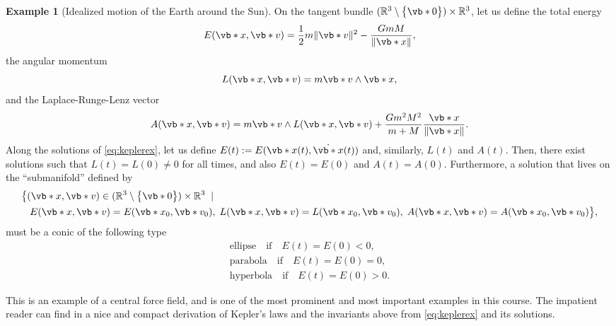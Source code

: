 \documentclass[english,fontsize=11pt,paper=b5]{scrbook}
\theoremstyle{definition}
\newtheorem{example}{Example}[chapter]
\begin{document}
\begin{example}[Idealized motion of the Earth around the Sun]
    On the tangent bundle $(\mathbb{R}^3\setminus\big\{\vb*{0}\big\})\times\mathbb{R}^3$, let us define the total energy
    \begin{equation}\label{eq:energyKepler}
      E(\vb*{x},\vb*{v}) = \frac{1}{2}m\|\vb*{v}\|^2 - \frac{GmM}{\|\vb*{x}\|},
    \end{equation}
    the angular momentum
    \begin{equation}
      L(\vb*{x},\vb*{v}) = m \vb*{v} \wedge \vb*{x},
    \end{equation}
    and the Laplace-Runge-Lenz vector
    \begin{equation}
      A(\vb*{x},\vb*{v}) = m \vb*{v} \wedge L(\vb*{x}, \vb*{v}) + \frac{G m^2 M^2}{m+M} \frac{\vb*{x}}{\|\vb*{x}\|}.
    \end{equation}
    Along the solutions of \eqref{eq:keplerex}, let us define $E(t):=E(\vb*{x}(t),\dot{\vb*{x}}(t))$ and, similarly, $L(t)$ and $A(t)$. Then, there exist solutions such that $L(t) = L(0) \neq 0$ for all times, and also $E(t) = E(0)$ and $A(t) = A(0)$. Furthermore, a solution that lives on the ``submanifold'' defined by
    \begin{equation}
      \begin{aligned}
        \big\{
       & (\vb*{x}, \vb*{v})\in (\mathbb{R}^3\setminus\big\{\vb*{0}\big\})\times\mathbb{R}^3 \;\mid \\
       & \;
       E(\vb*{x},\vb*{v}) = E(\vb*{x}_0, \vb*{v}_0),\;
       L(\vb*{x},\vb*{v}) = L(\vb*{x}_0, \vb*{v}_0),\;
       A(\vb*{x},\vb*{v}) = A(\vb*{x}_0, \vb*{v}_0)
     \big\},
      \end{aligned}
    \end{equation}
    must be a conic of the following type
    \begin{equation}
      \begin{split}
        \mbox{ellipse} \quad \mbox{if} \quad E(t) = E(0) < 0, \\
        \mbox{parabola} \quad \mbox{if} \quad E(t) = E(0) = 0, \\
        \mbox{hyperbola} \quad \mbox{if} \quad E(t) = E(0) > 0.
      \end{split}
    \end{equation}

    This is an example of a central force field, and is one of the most prominent and most important examples in this course.
    The impatient reader can find in \cite[Ch. 1]{book:knauf} a nice and compact derivation of Kepler's laws and the invariants above from \eqref{eq:keplerex} and its solutions.
  \end{example}
\end{document}

